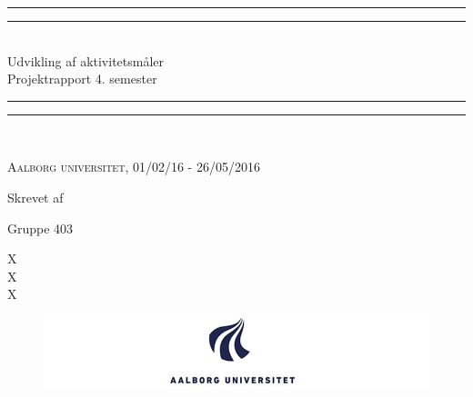 \clearpage
\thispagestyle{empty}




\begin{center}
	\vspace*{\baselineskip}
	\rule{\textwidth}{1.6pt}\vspace*{-\baselineskip}\vspace*{2pt} %
	\rule{\textwidth}{0.4pt}\\[\baselineskip] %
	
	{\huge Udvikling af aktivitetsmåler\\[0.3\baselineskip] \LARGE Projektrapport 4. semester}\\[0.2\baselineskip] %
	
	\rule{\textwidth}{0.4pt}\vspace*{-\baselineskip}\vspace{3.2pt} %
	\rule{\textwidth}{1.6pt}\\[\baselineskip] %
	\vspace*{3\baselineskip}
	
	\scshape %
	Aalborg universitet,  01/02/16 - 26/05/2016 \par %
	
	\vspace*{2\baselineskip} %
	
	Skrevet af \\
	{\Large Gruppe 403\par}
\end{center} %
{\color{white}X \\ X \\ X \\}
\begin{figure}[H]
	\centering
	\begin{minipage}[b]{1\textwidth}
		\includegraphics[width=1.05\textwidth]{figures/aaulogo2.JPG}
	\end{minipage}
	\hfill
\end{figure}

